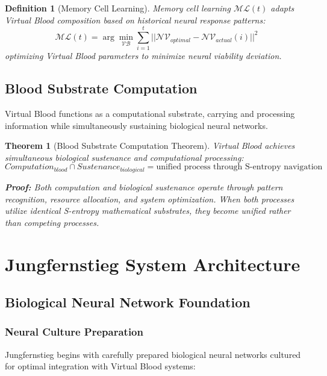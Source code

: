 \documentclass[12pt,a4paper]{article}
\newtheorem{theorem}{Theorem}
\newtheorem{definition}{Definition}
\begin{document}
\begin{definition}[Memory Cell Learning]
Memory cell learning $\mathcal{ML}(t)$ adapts Virtual Blood composition based on historical neural response patterns:
\begin{equation}
\mathcal{ML}(t) = \arg\min_{\mathcal{VB}} \sum_{i=1}^{t} ||\mathcal{NV}_{optimal} - \mathcal{NV}_{actual}(i)||^2
\end{equation}
optimizing Virtual Blood parameters to minimize neural viability deviation.
\end{definition}

\subsection{Blood Substrate Computation}

Virtual Blood functions as a computational substrate, carrying and processing information while simultaneously sustaining biological neural networks.

\begin{theorem}[Blood Substrate Computation Theorem]
Virtual Blood achieves simultaneous biological sustenance and computational processing:
\begin{equation}
Computation_{blood} \cap Sustenance_{biological} = \text{unified process through S-entropy navigation}
\end{equation}

\textbf{Proof:}
Both computation and biological sustenance operate through pattern recognition, resource allocation, and system optimization. When both processes utilize identical S-entropy mathematical substrates, they become unified rather than competing processes.
\end{theorem}

\section{Jungfernstieg System Architecture}

\subsection{Biological Neural Network Foundation}

\subsubsection{Neural Culture Preparation}

Jungfernstieg begins with carefully prepared biological neural networks cultured for optimal integration with Virtual Blood systems:
\end{document}

